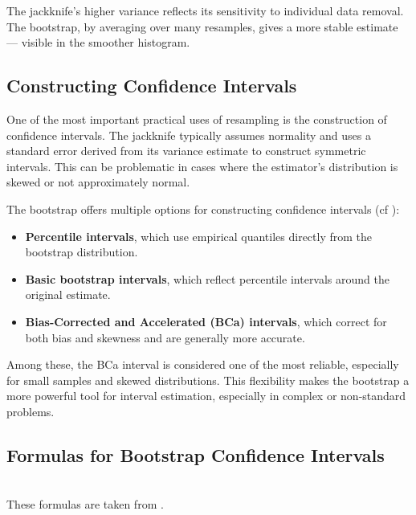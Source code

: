 \documentclass[aodsor,preprint]{imsart}
\numberwithin{equation}{section}
\theoremstyle{plain}
\begin{document}
The jackknife's higher variance reflects its sensitivity to individual data removal. The bootstrap, by averaging over many resamples, gives a more stable estimate — visible in the smoother histogram. \\


\subsection{Constructing Confidence Intervals}

One of the most important practical uses of resampling is the construction of confidence intervals. The jackknife typically assumes normality and uses a standard error derived from its variance estimate to construct symmetric intervals. This can be problematic in cases where the estimator's distribution is skewed or not approximately normal.

The bootstrap offers multiple options for constructing confidence intervals (cf \cite{efron1993introduction,davison1997bootstrap}):

\newpage

\begin{itemize}
  \item \textbf{Percentile intervals}, which use empirical quantiles directly from the bootstrap distribution.
  \item \textbf{Basic bootstrap intervals}, which reflect percentile intervals around the original estimate.
  \item \textbf{Bias-Corrected and Accelerated (BCa) intervals}, which correct for both bias and skewness and are generally more accurate.
\end{itemize}

Among these, the BCa interval is considered one of the most reliable, especially for small samples and skewed distributions. This flexibility makes the bootstrap a more powerful tool for interval estimation, especially in complex or non-standard problems.
\\

\subsection{Formulas for Bootstrap Confidence Intervals}\\
These formulas are taken from \cite{efron1982jackknife,efron1993introduction,shao1995jackknife}.
 
\end{document}
